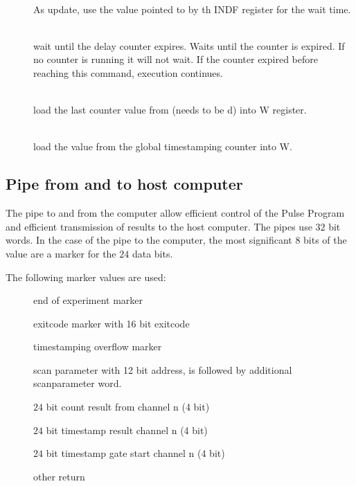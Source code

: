 \documentclass[11pt]{scrartcl}
\begin{document}
\begin{addmargin}{1cm}
\begin{description}
\item[]\hfill\\  
As update, use the value pointed to by th INDF register for the wait time.

\item[] \hfill\\   
wait until the delay counter expires. Waits until the counter is expired. If no counter is running it will not wait. If the counter expired before reaching this command, execution continues.

\item[ ]  \hfill\\  
load the last counter value from  (needs to be d) into W register.

\item[]  \hfill\\  
load the value from the global timestamping counter into W.

\end{description}
\end{addmargin}

\subsection{Pipe from and to host computer}
The pipe to and from the computer allow efficient control of the Pulse Program and efficient transmission of results to the host computer. The pipes use $32$ bit words. In the case of the pipe to the computer, the most significant $8$ bits of the value are a marker for the $24$ data bits.

The following marker values are used:
\begin{addmargin}{1cm}
\begin{description}
\item[] end of experiment marker
\item[] exitcode marker with 16 bit exitcode 
\item[] timestamping overflow marker
\item[] scan parameter with 12 bit address, is followed by additional scanparameter word.
\item[] $24$ bit count result from channel n (4 bit)
\item[] $24$ bit timestamp result channel n (4 bit)
\item[] $24$ bit timestamp gate start channel n (4 bit)
\item[] other return
\end{description}
\end{addmargin}
\end{document}
